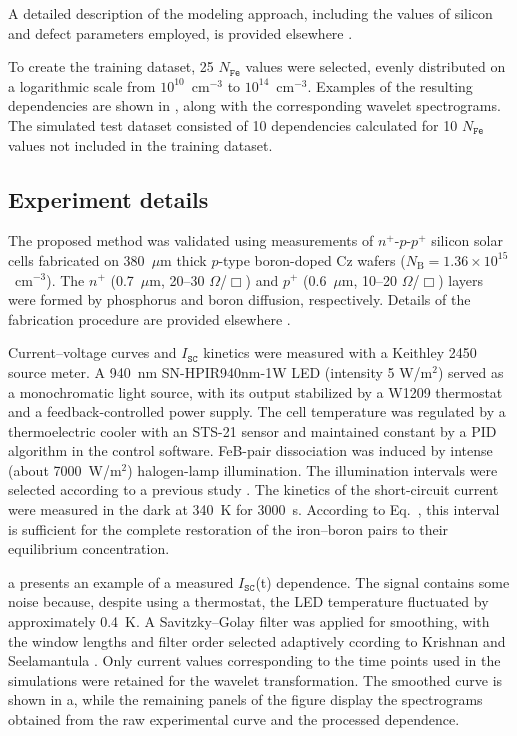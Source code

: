 \documentclass[10pt]{iopart}
\begin{document}
A detailed description of the modeling approach, including the values of silicon and defect parameters employed, is provided elsewhere \cite{Olikh2025MSEB, Olikh2019SM}.

To create the training dataset, 25 $N_\mathtt{Fe}$ values were selected, evenly distributed on a logarithmic scale from $10^{10}$~cm$^{-3}$ to $10^{14}$~cm$^{-3}$.
Examples of the resulting dependencies are shown in , along with the corresponding wavelet spectrograms.
The simulated test dataset consisted of 10 dependencies calculated for 10 $N_\mathtt{Fe}$ values not included in the training dataset.



\subsection{Experiment details}\label{subsec:ExpDet}

The proposed method was validated using measurements of $n^+$-$p$-$p^+$ silicon solar cells fabricated on
380~$\mu$m thick $p$-type boron-doped Cz wafers ($N_\mathrm{B}=1.36\times10^{15}$~cm$^{-3}$).
The $n^+$ (0.7~$\mu$m, 20–30 $\Omega$/$\Box$) and $p^+$ (0.6~$\mu$m, 10–20 $\Omega$/$\Box$)
layers were formed by phosphorus and boron diffusion, respectively.
Details of the fabrication procedure are provided elsewhere \cite{Olikh2021JAP}.

Current–voltage curves and $I_\mathtt{SC}$ kinetics were measured with a Keithley 2450 source meter.
A 940~nm SN-HPIR940nm-1W LED (intensity 5 W/m$^{2}$) served as a monochromatic light source,
with its output stabilized by a W1209 thermostat and a feedback-controlled power supply.
The cell temperature was regulated by a thermoelectric cooler with an STS-21 sensor and maintained constant by a PID algorithm in the control software.
FeB-pair dissociation was induced by intense (about 7000~W/m$^{2}$) halogen-lamp illumination.
The illumination intervals were selected according to a previous study \cite{OlikhPSSA}.
The kinetics of the short-circuit current were measured in the dark at 340~K for 3000~s.
According to Eq.~, this interval is sufficient for the complete restoration of the iron–boron pairs to their equilibrium concentration.


a presents an example of a measured $I_\mathtt{SC}$(t) dependence.
The signal contains some noise because, despite using a thermostat, the LED temperature fluctuated by approximately 0.4~K.
A Savitzky–Golay filter was applied for smoothing, with the window lengths and filter order selected adaptively ccording to Krishnan and Seelamantula \cite{Krishnan2013}.
Only current values corresponding to the time points used in the simulations were retained for the wavelet transformation.
The smoothed curve is shown in a,
while the remaining panels of the figure display the spectrograms obtained from the raw experimental curve and the processed dependence.
\end{document}
